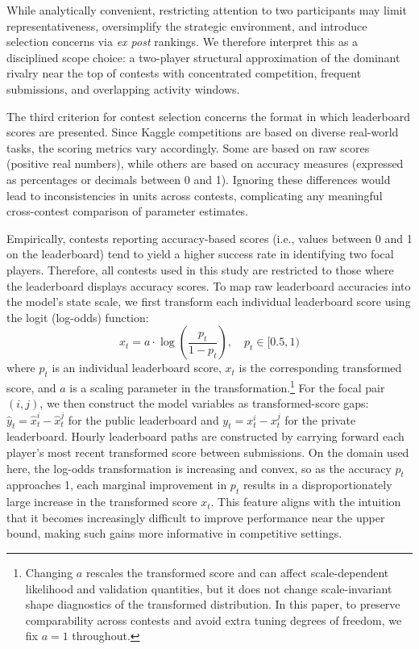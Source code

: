 \documentclass[mnsc]{informs3}
\begin{document}
While analytically convenient, restricting attention to two participants may limit representativeness, oversimplify the strategic environment, and introduce selection concerns via \textit{ex post} rankings.
We therefore interpret this as a disciplined scope choice: a two-player structural approximation of the dominant rivalry near the top of contests with concentrated competition, frequent submissions, and overlapping activity windows.

The third criterion for contest selection concerns the format in which leaderboard scores are presented.
Since Kaggle competitions are based on diverse real-world tasks, the scoring metrics vary accordingly.
Some are based on raw scores (positive real numbers), while others are based on accuracy measures (expressed as percentages or decimals between 0 and 1).
Ignoring these differences would lead to inconsistencies in units across contests, complicating any meaningful cross-contest comparison of parameter estimates.

Empirically, contests reporting accuracy-based scores (i.e., values between 0 and 1 on the leaderboard) tend to yield a higher success rate in identifying two focal players.
Therefore, all contests used in this study are restricted to those where the leaderboard displays accuracy scores.
To map raw leaderboard accuracies into the model's state scale, we first transform each individual leaderboard score using the logit (log-odds) function:
\begin{equation}\label{eq-leaderboard-transform}
x_t = a \cdot \log\left(\frac{p_t}{1-p_t}\right), \quad p_t\in[0.5, 1)
\end{equation}
where $p_t$ is an individual leaderboard score, $x_t$ is the corresponding transformed score, and $a$ is a scaling parameter in the transformation.\footnote{
Changing $a$ rescales the transformed score and can affect scale-dependent likelihood and validation quantities, but it does not change scale-invariant shape diagnostics of the transformed distribution.
In this paper, to preserve comparability across contests and avoid extra tuning degrees of freedom, we fix $a=1$ throughout.
}
For the focal pair $(i,j)$, we then construct the model variables as transformed-score gaps: $\hat y_t=\hat x_t^i-\hat x_t^j$ for the public leaderboard and $y_t=x_t^i-x_t^j$ for the private leaderboard.
Hourly leaderboard paths are constructed by carrying forward each player's most recent transformed score between submissions.
On the domain used here, the log-odds transformation is increasing and convex, so as the accuracy $p_t$ approaches 1, each marginal improvement in $p_t$ results in a disproportionately large increase in the transformed score $x_t$.
This feature aligns with the intuition that it becomes increasingly difficult to improve performance near the upper bound, making such gains more informative in competitive settings.
\end{document}
